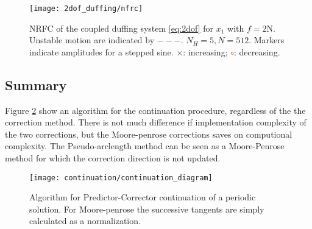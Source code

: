 \begin{figure}[!ht]
  \centering
  \texttt{[image: 2dof\_duffing/nfrc]}
  \caption{NRFC of the coupled duffing system \eqref{eq:2dof} for $x_1$ with
    $f=2$N. Unstable motion are indicated by $- - -$. $N_H = 5, N = 512$.
    Markers indicate amplitudes for a stepped sine.
    $\times$: increasing;
    \textcolor{red}{$\circ$}: decreasing.}
  \label{fig:hb_frf_2dof}
 \end{figure}

\subsection{Summary}
\label{sec:cont_summary}

Figure \ref{fig:cont_algo} show an algorithm for the continuation procedure,
regardless of the the correction method. There is not much difference if
implementation complexity of the two corrections, but the Moore-penrose
corrections saves on computional complexity. The Pseudo-arclength method can be
seen as a Moore-Penrose method for which the correction direction is not
updated.

\begin{figure}[!ht]
  \centering
  \texttt{[image: continuation/continuation\_diagram]}
  \caption{Algorithm for Predictor-Corrector continuation of a periodic
    solution. For Moore-penrose the successive tangents are simply calculated as
  a normalization.}
  \label{fig:cont_algo}
\end{figure}



